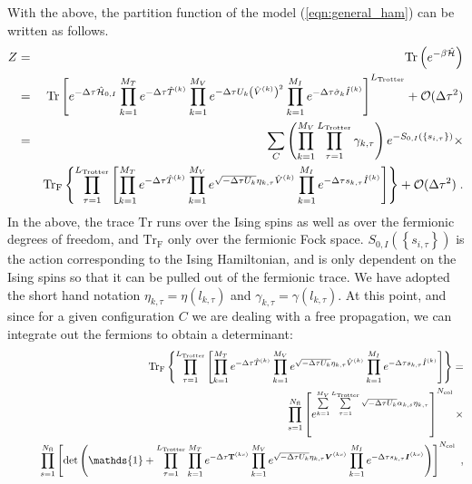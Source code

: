 With the above, the partition function of the model (\ref{eqn:general_ham}) can be written as follows.
\begin{eqnarray}\label{eqn:partition_1}
Z &=& \mathop{\mathrm{Tr}}{\left(e^{-\beta \hat{\mathcal{H}} }\right)}\nonumber\\
  &=&   \mathop{\mathrm{Tr}}{  \left[ e^{-\Delta \tau \hat{\mathcal{H}}_{0,I}}   \prod_{k=1}^{M_T}   e^{-\Delta \tau \hat{T}^{(k)}}  
    \prod_{k=1}^{M_V}   e^{ - \Delta \tau  U_k \left(  \hat{V}^{(k)} \right)^2}   \prod_{k=1}^{M_I}   e^{  -\Delta \tau  \hat{\sigma}_{k}  \hat{I}^{(k)}} 
   \right]^{L_{\text{Trotter}}}}  + \mathcal{O}(\Delta\tau^{2})\nonumber \\
   &=&
   \sum_{C} \left( \prod_{k=1}^{M_V} \prod_{\tau=1}^{L_{\mathrm{Trotter}}} \gamma_{k,\tau} \right) e^{-S_{0,I} \left( \left\{ s_{i,\tau} \right\}  \right) }\times \nonumber\\
   &\quad&
    \mathop{\mathrm{Tr}_{\mathrm{F}}}{ \left\{  \prod_{\tau=1}^{L_{\mathrm{Trotter}}} \left[   \prod_{k=1}^{M_T}   e^{-\Delta \tau \hat{T}^{(k)}}  
    \prod_{k=1}^{M_V}   e^{  \sqrt{ -\Delta \tau  U_k} \eta_{k,\tau} \hat{V}^{(k)} }   \prod_{k=1}^{M_I}   e^{  -\Delta \tau s_{k,\tau}  \hat{I}^{(k)}}  \right]\right\} }+ \mathcal{O}(\Delta\tau^{2})\;.
\end{eqnarray}
In the above,  the trace $\mathrm{Tr} $  runs over the Ising spins as well as over the fermionic degrees of freedom, and $ \mathrm{Tr}_{\mathrm{F}}  $ only over the  fermionic Fock space. 
$S_{0,I} \left( \left\{ s_{i,\tau} \right\}  \right)  $ is the action  corresponding to the Ising Hamiltonian,  and is only dependent on the Ising spins so that  it can be pulled out of the fermionic trace.  We have adopted the short hand notation $\eta_{k,\tau}  = \eta(l_{k,\tau})$   and $\gamma_{k,\tau}  = \gamma(l_{k,\tau})$.
At this point,  and  since for a given configuration $C$  we are dealing with a free propagation, we can integrate out the fermions to obtain a determinant: 
\begin{eqnarray}
 &\quad&\Trf{ \left\{  \prod_{\tau=1}^{L_{\mathrm{Trotter}}} \left[   \prod_{k=1}^{M_T}   e^{-\Delta \tau \hat{T}^{(k)}}  
    \prod_{k=1}^{M_V}   e^{  \sqrt{ - \Delta \tau  U_k} \eta_{k,\tau} \hat{V}^{(k)} }   \prod_{k=1}^{M_I}   e^{  -\Delta \tau s_{k,\tau}  \hat{I}^{(k)}}  \right] \right\}} = \nonumber\\
&\quad& \quad\prod\limits_{s=1}^{N_{\mathrm{fl}}} \left[  e^{\sum\limits_{k=1}^{M_V} \sum\limits_{\tau = 1}^{L_{\mathrm{Trotter}}}\sqrt{-\Delta \tau U_k}  \alpha_{k,s} \eta_{k,\tau} }
   \right]^{N_{\mathrm{col}}}\times
\nonumber\\
&\quad&\quad   \prod\limits_{s=1}^{N_{\mathrm{fl}}} 
   \left[
    \det\left(  \mathds{1} + 
     \prod_{\tau=1}^{L_{\mathrm{Trotter}}}   \prod_{k=1}^{M_T}   e^{-\Delta \tau \textbf{T}^{(ks)}}  
    \prod_{k=1}^{M_V}   e^{  \sqrt{ -\Delta \tau  U_k} \eta_{k,\tau} {\bm V}^{(ks)} }   \prod_{k=1}^{M_I}   e^{  -\Delta \tau s_{k,\tau}  {\bm I}^{(ks)}}  
     \right) \right]^{N_{\mathrm{col}}}\;,
\end{eqnarray}

